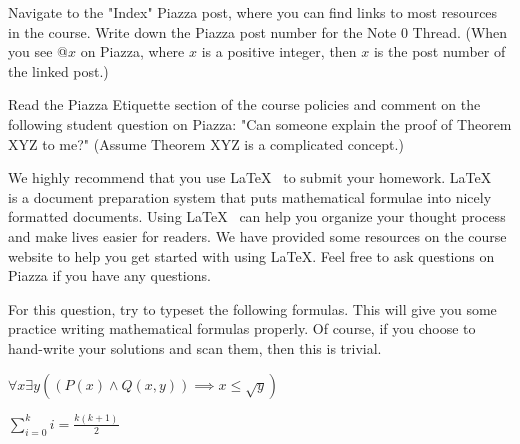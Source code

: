 \begin{Parts}

    \Part Navigate to the "Index" Piazza post, where you can find links to most resources in the course. Write down the Piazza post number for the Note 0 Thread. (When you see @$x$ on Piazza, where $x$ is a positive integer, then $x$ is the post number of the linked post.)
  
    \Part Read the Piazza Etiquette section of the course policies and comment on the following student question on Piazza: "Can someone explain the proof of Theorem XYZ to me?" (Assume Theorem XYZ is a complicated concept.)
  
\end{Parts}


\Question{\LaTeX}

We highly recommend that you use \LaTeX ~ to submit your homework. \LaTeX ~ is a document preparation system that puts mathematical formulae into nicely formatted documents. Using \LaTeX ~ can help you organize your thought process and make lives easier for readers. We have provided some resources on the course website to help you get started with using \LaTeX. Feel free to ask questions on Piazza if you have any questions.

For this question, try to typeset the following formulas. This will give you some practice writing mathematical formulas properly. Of course, if you choose to hand-write your solutions and scan them, then this is trivial. 

\begin{Parts}

  \Part $\forall x \exists y \left(\left(P(x) \wedge Q(x, y)\right) \implies x \leq \sqrt{y} \right)$
  
  \Part $\displaystyle \sum_{i = 0}^k i = \frac{k(k + 1)}{2}$
  
\end{Parts}
